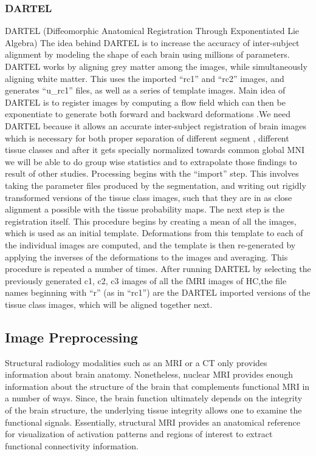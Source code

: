 \documentclass{article}
\begin{document}
\subsubsection{DARTEL}

DARTEL (Diffeomorphic Anatomical Registration Through Exponentiated
Lie Algebra) The idea behind DARTEL is to increase the accuracy of
inter-subject alignment by modeling the shape of each brain using
millions of parameters. DARTEL works by aligning grey matter among the
images, while simultaneously aligning white matter. This uses the
imported ``rc1'' and ``rc2'' images, and generates ``u\_rc1'' files,
as well as a series of template images. Main idea of DARTEL is to
register images by computing a flow field which can then be
exponentiate to generate both forward and backward deformations .We
need DARTEL because it allows an accurate inter-subject registration
of brain images which is necessary for both proper separation of
different segment , different tissue classes and after it gets
specially normalized towards common global MNI we will be able to do
group wise statistics and to extrapolate those findings to result of
other studies. Processing begins with the ``import'' step. This
involves taking the parameter files produced by the segmentation, and
writing out rigidly transformed versions of the tissue class images,
such that they are in as close alignment a possible with the tissue
probability maps. The next step is the registration itself. This
procedure begins by creating a mean of all the images, which is used
as an initial template. Deformations from this template to each of the
individual images are computed, and the template is then re-generated
by applying the inverses of the deformations to the images and
averaging. This procedure is repeated a number of times. After
running DARTEL by selecting the previously generated c1, c2, c3 images
of all the fMRI images of HC,the file names beginning with ``r'' (as
in ``rc1'') are the DARTEL imported versions of the tissue class
images, which will be aligned together next.

\subsection{Image Preprocessing}

Structural radiology modalities such as an MRI or a CT only provides
information about brain anatomy. Nonetheless, nuclear MRI provides
enough information about the structure of the brain that complements
functional MRI in a number of ways. Since, the brain function
ultimately depends on the integrity of the brain structure, the
underlying tissue integrity allows one to examine the functional
signals. Essentially, structural MRI provides an anatomical reference
for visualization of activation patterns and regions of interest to
extract functional connectivity information.
\end{document}
